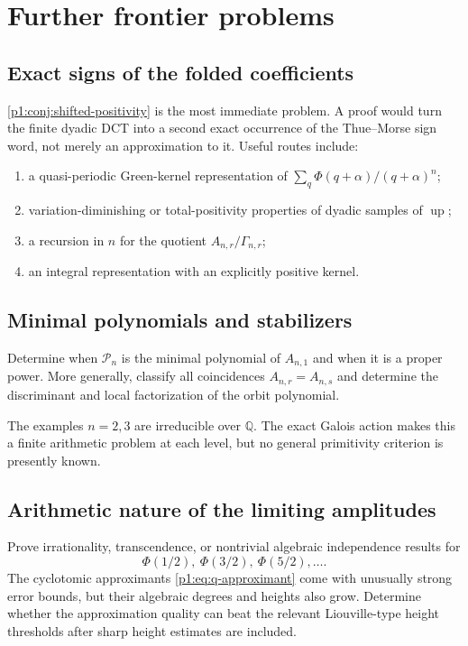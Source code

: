 \documentclass[11pt,oneside]{article}
\theoremstyle{definition}
\theoremstyle{remark}
\newcommand{\Q}{\mathbb Q}
\newcommand{\Up}{\operatorname{up}}
\newcommand{\PhiU}{\Phi}
\begin{document}
\section{Further frontier problems}\label{p1:sec:open}

\subsection{Exact signs of the folded coefficients}

\cref{p1:conj:shifted-positivity} is the most immediate problem.  A proof would
turn the finite dyadic DCT into a second exact occurrence of the Thue--Morse sign
word, not merely an approximation to it.  Useful routes include:
\begin{enumerate}
 \item a quasi-periodic Green-kernel representation of
 $\sum_q\PhiU(q+\alpha)/(q+\alpha)^n$;
 \item variation-diminishing or total-positivity properties of dyadic samples of
 $\Up$;
 \item a recursion in $n$ for the quotient $A_{n,r}/\Gamma_{n,r}$;
 \item an integral representation with an explicitly positive kernel.
\end{enumerate}

\subsection{Minimal polynomials and stabilizers}

\begin{problem}\label{p1:prob:minimal-polynomials}
Determine when $\mathcal P_n$ is the minimal polynomial of $A_{n,1}$ and when it
is a proper power.  More generally, classify all coincidences
$A_{n,r}=A_{n,s}$ and determine the discriminant and local factorization of the
orbit polynomial.
\end{problem}

The examples $n=2,3$ are irreducible over $\Q$.  The exact Galois action makes
this a finite arithmetic problem at each level, but no general primitivity
criterion is presently known.

\subsection{Arithmetic nature of the limiting amplitudes}

\begin{problem}\label{p1:prob:amplitude-arithmetic}
Prove irrationality, transcendence, or nontrivial algebraic independence results
for
\[
 \PhiU(1/2),\ \PhiU(3/2),\ \PhiU(5/2),\ldots.
\]
The cyclotomic approximants \eqref{p1:eq:q-approximant} come with unusually strong
error bounds, but their algebraic degrees and heights also grow.  Determine
whether the approximation quality can beat the relevant Liouville-type height
thresholds after sharp height estimates are included.
\end{problem}
\end{document}
